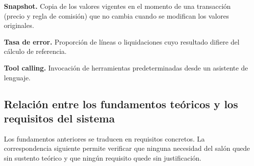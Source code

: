 \noindent \textbf{Snapshot.} Copia de los valores vigentes en el momento de una transacción (precio y regla de comisión) que no cambia cuando se modifican los valores originales.

\noindent \textbf{Tasa de error.} Proporción de líneas o liquidaciones cuyo resultado difiere del cálculo de referencia.

\noindent \textbf{Tool calling.} Invocación de herramientas predeterminadas desde un asistente de lenguaje.

\subsection{Relación entre los fundamentos teóricos y los requisitos del sistema}

Los fundamentos anteriores se traducen en requisitos concretos. La correspondencia siguiente permite verificar que ninguna necesidad del salón quede sin sustento teórico y que ningún requisito quede sin justificación.


